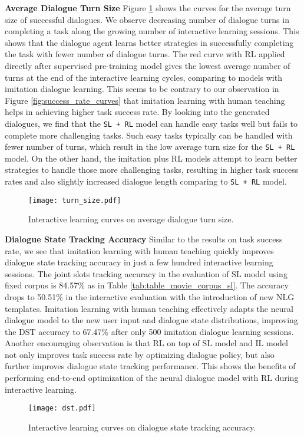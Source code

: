 \documentclass[11pt,a4paper]{article}
\begin{document}
    \textbf{Average Dialogue Turn Size} \hspace{3mm} Figure \ref{fig:turn_size_curves} shows the curves for the average turn size of successful dialogues. We observe decreasing number of dialogue turns in completing a task along the growing number of interactive learning sessions. This shows that the dialogue agent learns better strategies in successfully completing the task with fewer number of dialogue turns. The red curve with RL applied directly after supervised pre-training model gives the lowest average number of turns at the end of the interactive learning cycles, comparing to models with imitation dialogue learning. This seems to be contrary to our observation in Figure \ref{fig:success_rate_curves} that imitation learning with human teaching helps in achieving higher task success rate. By looking into the generated dialogues, we find that the {\tt SL + RL} model can handle easy tasks well but fails to complete more challenging tasks. Such easy tasks typically can be handled with fewer number of turns, which result in the low average turn size for the {\tt SL + RL} model. On the other hand, the imitation plus RL models attempt to learn better strategies to handle those more challenging tasks, resulting in higher task success rates and also slightly increased dialogue length comparing to {\tt SL + RL} model.

        \begin{figure}[t]
          \centering
          \texttt{[image: turn\_size.pdf]}
          \vspace*{-4ex}
          \caption{Interactive learning curves on average dialogue turn size.}
          \label{fig:turn_size_curves}
        \end{figure}

    \textbf{Dialogue State Tracking Accuracy} \hspace{3mm} Similar to the results on task success rate, we see that imitation learning with human teaching quickly improves dialogue state tracking accuracy in just a few hundred interactive learning sessions. The joint slots tracking accuracy in the evaluation of SL model using fixed corpus is 84.57\% as in Table \ref{tab:table_movie_corpus_sl}. The accuracy drops to 50.51\% in the interactive evaluation with the introduction of new NLG templates. Imitation learning with human teaching effectively adapts the neural dialogue model to the new user input and dialogue state distributions, improving the DST accuracy to 67.47\% after only 500 imitation dialogue learning sessions. Another encouraging observation is that RL on top of SL model and IL model not only improves task success rate by optimizing dialogue policy, but also further improves dialogue state tracking performance. This shows the benefits of performing end-to-end optimization of the neural dialogue model with RL during interactive learning. 
        \begin{figure}[t]
          \centering
          \texttt{[image: dst.pdf]}
          \vspace*{-4ex}
          \caption{Interactive learning curves on dialogue state tracking accuracy.}
          \label{fig:dst_curves}
        \end{figure}
\end{document}
